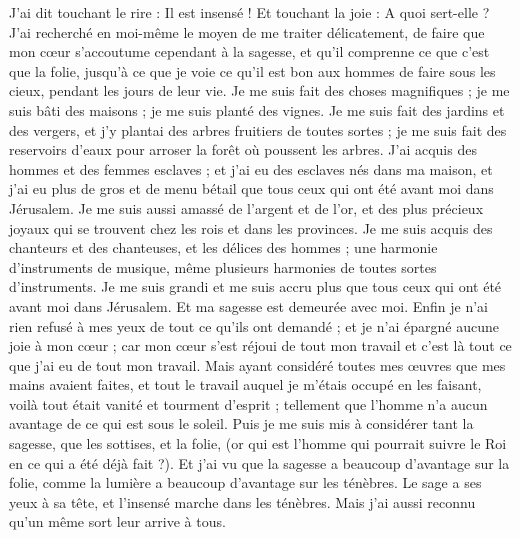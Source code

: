 \begin{multicols}{2}
J'ai dit touchant le rire : Il est insensé ! Et touchant la joie : A quoi sert-elle ?
J'ai recherché en moi-même le moyen de me traiter délicatement, de faire que mon cœur s'accoutume cependant à la sagesse, et qu'il comprenne ce que c'est que la folie, jusqu’à ce que je voie ce qu'il est bon aux hommes de faire sous les cieux, pendant les jours de leur vie. 
Je me suis fait des choses magnifiques ; je me suis bâti des maisons ; je me suis planté des vignes.
Je me suis fait des jardins et des vergers, et j'y plantai des arbres fruitiers de toutes sortes ;
je me suis fait des reservoirs d'eaux pour arroser la forêt où poussent les arbres.
J'ai acquis des hommes et des femmes esclaves ; et j'ai eu des esclaves nés dans ma maison, et j'ai eu plus de gros et de menu bétail que tous ceux qui ont été avant moi dans Jérusalem. 
Je me suis aussi amassé de l'argent et de l'or, et des plus précieux joyaux qui se trouvent chez les rois et dans les provinces. Je me suis acquis des chanteurs et des chanteuses, et les délices des hommes ; une harmonie d'instruments de musique, même plusieurs harmonies de toutes sortes d'instruments. 
Je me suis grandi et me suis accru plus que tous ceux qui ont été avant moi dans Jérusalem. Et ma sagesse est demeurée avec moi.
Enfin je n'ai rien refusé à mes yeux de tout ce qu'ils ont demandé ; et je n'ai épargné aucune joie à mon cœur ; car mon cœur s'est réjoui de tout mon travail et c'est là tout ce que j'ai eu de tout mon travail.
Mais ayant considéré toutes mes œuvres que mes mains avaient faites, et tout le travail auquel je m'étais occupé en les faisant, voilà tout était vanité et tourment d'esprit ; tellement que l'homme n'a aucun avantage de ce qui est sous le soleil.
Puis je me suis mis à considérer tant la sagesse, que les sottises, et la folie, (or qui est l'homme qui pourrait suivre le Roi en ce qui a été déjà fait ?).
Et j'ai vu que la sagesse a beaucoup d'avantage sur la folie, comme la lumière a beaucoup d'avantage sur les ténèbres.
Le sage a ses yeux à sa tête, et l'insensé marche dans les ténèbres. Mais j'ai aussi reconnu qu'un même sort leur arrive à tous.

\end{multicols}
